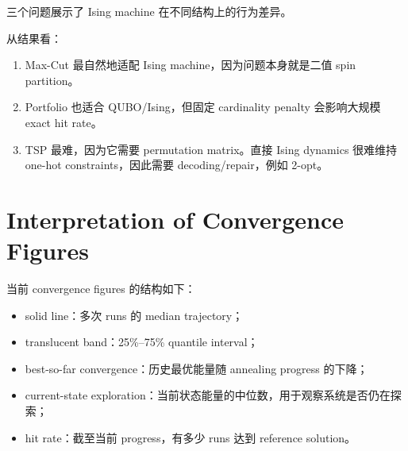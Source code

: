 \documentclass[UTF8]{ctexart}
\begin{document}
三个问题展示了 Ising machine 在不同结构上的行为差异。

\begin{table}[H]
\centering
{}
\caption{Cross-problem comparison.}
\end{table}

从结果看：
\begin{enumerate}[leftmargin=2em]
    \item Max-Cut 最自然地适配 Ising machine，因为问题本身就是二值 spin partition。
    \item Portfolio 也适合 QUBO/Ising，但固定 cardinality penalty 会影响大规模 exact hit rate。
    \item TSP 最难，因为它需要 permutation matrix。直接 Ising dynamics 很难维持 one-hot constraints，因此需要 decoding/repair，例如 2-opt。
\end{enumerate}

\section{Interpretation of Convergence Figures}

当前 convergence figures 的结构如下：
\begin{itemize}[leftmargin=2em]
    \item solid line：多次 runs 的 median trajectory；
    \item translucent band：25\%--75\% quantile interval；
    \item best-so-far convergence：历史最优能量随 annealing progress 的下降；
    \item current-state exploration：当前状态能量的中位数，用于观察系统是否仍在探索；
    \item hit rate：截至当前 progress，有多少 runs 达到 reference solution。
\end{itemize}
\end{document}
